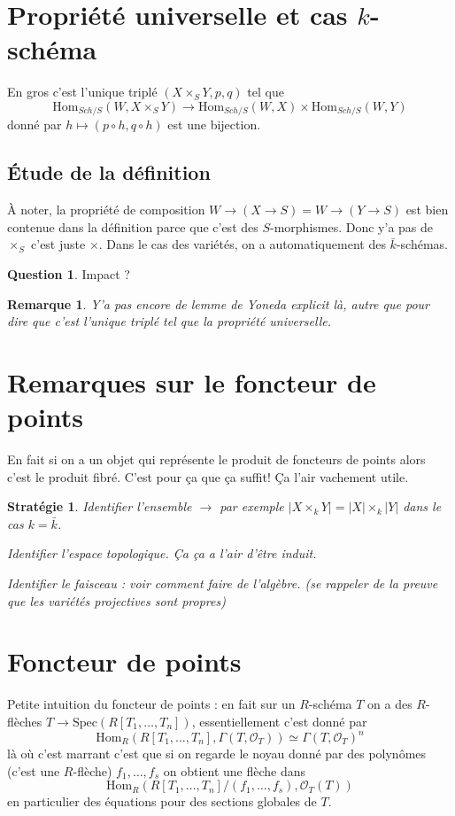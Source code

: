 \documentclass[a4paper,12pt]{book}
\newcommand{\Or}{\mathcal{O}}
\newcommand{\Hom}{\textrm{Hom}}
\newcommand{\Spec}{\textrm{Spec}}
\theoremstyle{plain}
\newtheorem{rem}{Remarque}
\newtheorem{strat}{Stratégie}
\theoremstyle{definition}
\newtheorem{quest}{Question}
\theoremstyle{remark}
\begin{document}
\section{Propriété universelle et cas $k$-schéma}
En gros c'est l'unique triplé $(X\times_S Y, p,q)$
tel que \[\Hom_{Sch/S}(W, X\times_S Y)\to \Hom_{Sch/S}(W,X)\times \Hom_{Sch/S}(W,Y)\]
donné par $h\mapsto (p\circ h,q\circ h)$ est une bijection.
\subsection{Étude de la définition}
À noter, la propriété de composition $W\to (X\to S)=W\to (Y\to S)$
est bien contenue dans la définition parce que c'est des 
$S$-morphismes. Donc y'a pas de $\times_S$ c'est juste $\times$.
Dans le cas des variétés, on a automatiquement des 
$\bar k$-schémas.
\begin{quest}
  Impact ?
\end{quest}

\begin{rem}
  Y'a pas encore de lemme de Yoneda explicit là, autre que pour
  dire que c'est l'unique triplé tel que la propriété universelle.
\end{rem}


\section{Remarques sur le foncteur de points}
En fait si on a un objet qui représente le produit de foncteurs
de points alors c'est le produit fibré. C'est pour ça que ça 
suffit! Ça l'air vachement utile. 
\begin{strat}
  \item Identifier l'ensemble $\to$ par exemple
    $|X\times_k Y|=|X|\times_k|Y|$ dans le cas $k=\bar k$.
  \item Identifier l'espace topologique. Ça ça a l'air d'être
    induit.
  \item Identifier le faisceau : voir comment faire de l'algèbre.
    (se rappeler de la preuve que les variétés projectives sont
    propres)
\end{strat}

\section{Foncteur de points}
Petite intuition du foncteur de points : en fait sur un $R$-schéma $T$
on a des $R$-flèches $T\to \Spec(R[T_1,\ldots,T_n])$, essentiellement 
c'est donné par 
\[\Hom_R(R[T_1,\ldots,T_n],\Gamma(T,\Or_T))\simeq \Gamma(T,\Or_T)^n\]
là où c'est marrant c'est que si on regarde le noyau donné par des 
polynômes (c'est une $R$-flèche) $f_1,\ldots, f_s$ on obtient une 
flèche dans 
\[\Hom_R(R[T_1,\ldots, T_n]/(f_1,\ldots, f_s), \Or_T(T))\]
en particulier des équations pour des sections globales de $T$.
\end{document}
